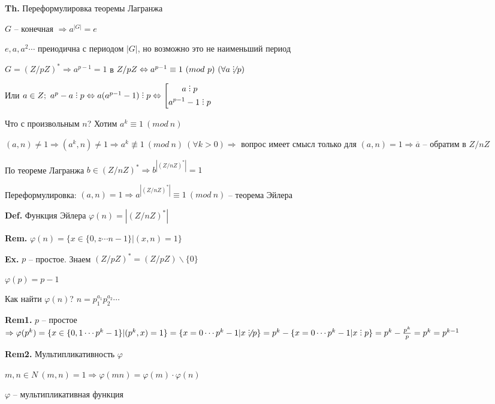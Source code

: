 \documentclass[14pt, letter paper]{article}
\def\divby{%
  \mathrel{\text{\vbox{\baselineskip.65ex\lineskiplimit0pt\hbox{.}\hbox{.}\hbox{.}}}}%
}
\begin{document}
\vspace{5mm}

\textbf{Th.} Переформулировка теоремы Лагранжа

$G$ -- конечная $\Rightarrow a^{|G|} = e$

$e, a, a^2 \cdots$ преиодична с периодом $|G|$, но возможно это не наименьший период

$G = (Z/pZ)^* \Rightarrow a^{p-1} = 1$ в $Z/pZ \Leftrightarrow a^{p-1} \equiv 1\ (mod\ p)\ (\forall a \not\divby p)$

Или $a \in Z;\ a^p - a \divby p \Leftrightarrow a(a^{p-1}-1) \divby p \Leftrightarrow \left[ \begin{gathered}
    a \divby p \\
    a^{p-1} - 1 \divby p
\end{gathered} \right.$
\vspace{5mm}

Что с произвольным $n$? Хотим $a^k \equiv 1\ (mod\ n)$

$(a, n) \neq 1 \Rightarrow (a^k, n) \neq 1 \Rightarrow a^k \not\equiv 1\ (mod\ n)\ (\forall k > 0) \Rightarrow$ вопрос имеет смысл только для $(a, n) = 1 \Rightarrow \overline{a}$ -- обратим в $Z/nZ$

По теореме Лагранжа $b \in (Z/nZ)^* \Rightarrow b^{|(Z/nZ)^*|} = 1$

Переформулировка: $(a, n) = 1 \Rightarrow a^{|(Z/nZ)^*|} \equiv 1\ (mod\ n)$ -- теорема Эйлера

\vspace{5mm}

\textbf{Def.} Функция Эйлера $\varphi(n) = |(Z/nZ)^*|$

\textbf{Rem.} $\varphi(n) = \{x \in \{0, z \cdots n-1\} | (x, n) = 1\}$

\textbf{Ex.} $p$ -- простое. Знаем $(Z/pZ)^* = (Z/pZ) \backslash \{0\}$

$\varphi(p) = p - 1$

Как найти $\varphi(n)$? $n = p_1^{a_1} p_2^{a_2} \cdots$

\textbf{Rem1.} $p$ -- простое $\Rightarrow \varphi(p^k) = \{x \in \{0, 1 \cdots p^k-1\}| (p^k, x) = 1\} = \{x = 0 \cdots p^k-1| x \not\divby p\} = p^k - \{x = 0 \cdots p^k-1| x \divby p\} = p^k - \frac{p^k}{p} = p^k = p^{k-1}$

\textbf{Rem2.} Мультипликативность $\varphi$

$m, n \in N\ (m, n) = 1 \Rightarrow \varphi(mn) = \varphi(m) \cdot \varphi(n)$

$\varphi$ -- мультипликативная функция
\end{document}
